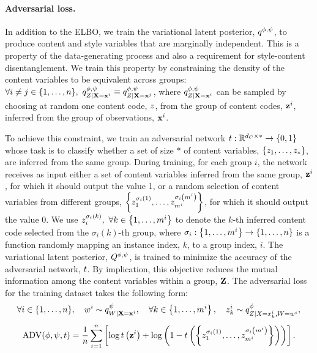 \documentclass[../thesis.tex]{subfiles}
\begin{document}
\paragraph{Adversarial loss.} In addition to the ELBO, we train the variational latent posterior, $q^{\phi, \psi}$, to produce content and style variables that are marginally independent. This is a property of the data-generating process and also a requirement for style-content disentanglement. We train this property by constraining the density of the content variables to be equivalent across groups: $\forall i \neq j \in \{1,\dots,\mycnt{n}\}, ~ \myfunc{q}^{\phi, \psi}_{\myrv{z} | \mygroup{\myrv{x}} = \mygroup{\myvect{x}}^i} \equiv \myfunc{q}^{\phi, \psi}_{\myrv{z} | \mygroup{\myrv{x}} = \mygroup{\myvect{x}}^j}$, where $\myfunc{q}^{\phi, \psi}_{\myrv{z} | \mygroup{\myrv{x}} = \mygroup{\myvect{x}}^i}$ can be sampled by choosing at random one content code, $z$, from the group of content codes, $\mathbf{{z}}^i$, inferred from the group of observations, $\mathbf{{x}}^i$. 

To achieve this constraint, we train an adversarial network $\myfunc{t}: \mathbb{R}^{\mydim{c} \times *} \to \{0, 1\}$ whose task is to classify whether a set of size $*$ of content variables, $\{z_1,\dots,z_{*}\}$, are inferred from the same group. During training, for each group $i$, the network receives as input either a set of content variables inferred from the same group, $\mathbf{{z}}^i$, for which it should output the value 1, or a random selection of content variables from different groups, $\left\{ z^{\sigma_i(1)}_1,\dots,z^{\sigma_i\left(m^i\right)}_{m^i} \right\}$, for which it should output the value 0. We use $z^{\sigma_i(k)}_i, ~ \forall k \in \left\{1,\dots,m^i\right\}$ to denote the $k$-th inferred content code selected from the $\sigma_i (k)$-th group, where $\sigma_i: \left\{1,\dots,m^i\right\} \to \left\{1,\dots,n\right\}$ is a function randomly mapping an instance index, $k$, to a group index, $i$. The variational latent posterior, $\myrv{Q}^{\phi, \psi}$, is trained to minimize the accuracy of the adversarial network, $t$. By implication, this objective reduces the mutual information among the content variables within a group, $\mygroup{\myrv{z}}$. The adversarial loss for the training dataset takes the following form:
\[
      \forall i \in \{1,\dots,\mycnt{n}\}, \quad \myvect{w}^i \sim \myfunc{q}^{\psi}_{\myrv{w} | \mygroup{\myrv{x}} = \mygroup{\myvect{x}}^i}, \quad \forall k \in \left\{1,\dots,\mycnt{m}^i \right\}, \quad \myvect{z}^i_k \sim \myfunc{q}^{\phi}_{\myrv{z} | \myrv{x} = \myvect{x}^i_k, \myrv{w} = \myvect{w}^i},
\]
\begin{equation}
      \mathrm{ADV}(\phi, \psi, t) = \frac{1}{n} \sum_{i=1}^{n} \left[ \log t \left( \mathbf{{z}}^i \right) + \log \left( 1 - t \left( \left\{ z^{\sigma_i(1)}_1,\dots,z^{\sigma_i\left(m^i\right)}_{m^i} \right\} \right) \right) \right].
\label{eq:adv}
\end{equation}
\end{document}
